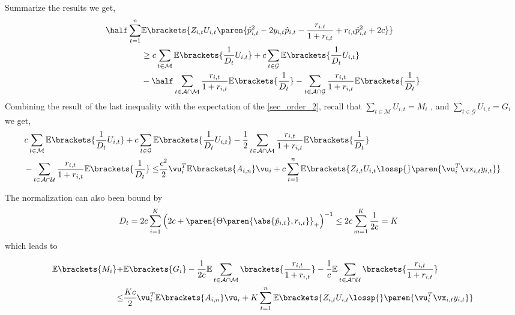 Summarize the results we get,
\begin{equation}
\begin{split}
\half \sum_{t=1}^{n}&\mathbb{E}\brackets{Z_{i,t}U_{i,t}\paren{\hat{p}_{i,t}^2-2y_{i,t}\hat{p}_{i,t}-\frac{r_{i,t}}{1+r_{i,t}}+r_{i,t}\hat{p}_{i,t}^{2}+2c}}\\
&\ge c \sum_{t\in\mathcal{M}}\mathbb{E}\brackets{\frac{1}{D_t}U_{i,t}}+c \sum_{t\in\mathcal{G}}\mathbb{E}\brackets{\frac{1}{D_t}U_{i,t}}\\
&-\half\sum_{t\in\mathcal{A\cap M}}\frac{r_{i,t}}{1+r_{i,t}}\mathbb{E}\brackets{\frac{1}{D_t}}
-\sum_{t\in\mathcal{A\cap G}}\frac{r_{i,t}}{1+r_{i,t}}\mathbb{E}\brackets{\frac{1}{D_t}}
\end{split}
\end{equation}
Combining the result of the last inequality with the expectation of the  \eqref{sec_order_2}, recall that  $\sum_{t\in\mathcal{M}}U_{i,t}=M_i$ , and  $\sum_{t\in\mathcal{G}}U_{i,t}=G_i$ we get,   
\begin{equation*}
\begin{split}
c \sum_{t\in\mathcal{M}}\mathbb{E}\brackets{\frac{1}{D_t}U_{i,t}}+c \sum_{t\in\mathcal{G}}\mathbb{E}&\brackets{\frac{1}{D_t}U_{i,t}}
-\frac{1}{2}\sum_{t\in\mathcal{A\cap M}}\frac{r_{i,t}}{1+r_{i,t}}\mathbb{E}\brackets{\frac{1}{D_t}}\\
-\sum_{t\in\mathcal{A\cap U}}\frac{r_{i,t}}{1+r_{i,t}}\mathbb{E}\brackets{\frac{1}{D_t}}
\le& \frac{c^2}{2} \vu_i^T \mathbb{E}\brackets{A_{i,n}} \vu_i+c\sum_{t=1}^{n}\mathbb{E}\brackets{{Z_{i,t}U_{i,t}\lossp{}\paren{\vu_i^T\vx_{i,t}y_{i,t}}}}
\end{split}
\end{equation*}

The normalization can also been bound by
\begin{equation*}
\begin{split}
D_{t}=2c\sum_{i=1}^{K}{\left({2c+\paren{\Theta\paren{\abs{\hat{p}_{i,t}},r_{i,t}}}_+}\right)^{-1}}& \le  2c\sum_{m=1}^{K}{\frac{1}{2c}}=K
\end{split}
\end{equation*}
which leads to


\begin{equation*}
\begin{split}
\mathbb{E}\brackets{M_{i}}+ &\mathbb{E}\brackets{G_{i}}
-\frac{1}{2c}\mathbb{E}\sum_{t\in\mathcal{A\cap M}}\brackets{\frac{r_{i,t}}{1+r_{i,t}}}
-\frac{1}{c}\mathbb{E}\sum_{t\in\mathcal{A\cap U}}\brackets{\frac{r_{i,t}}{1+r_{i,t}}}\\
\le& \frac{Kc}{2} \vu_i^T \mathbb{E}\brackets{A_{i,n}} \vu_i+K\sum_{t=1}^{n}\mathbb{E}\brackets{{Z_{i,t}U_{i,t}\lossp{}\paren{\vu_i^T\vx_{i,t}y_{i,t}}}}
\end{split}
\end{equation*}



